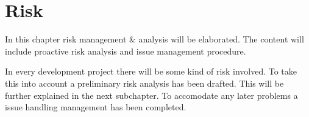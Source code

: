 \chapter{Risk}
In this chapter risk management & analysis will be elaborated. The content will include proactive risk analysis and issue management procedure. 

In every development project there will be some kind of risk involved. To take this into account a preliminary risk analysis has been drafted. This will be further explained in the next subchapter. To accomodate any later problems a issue handling management has been completed. 



